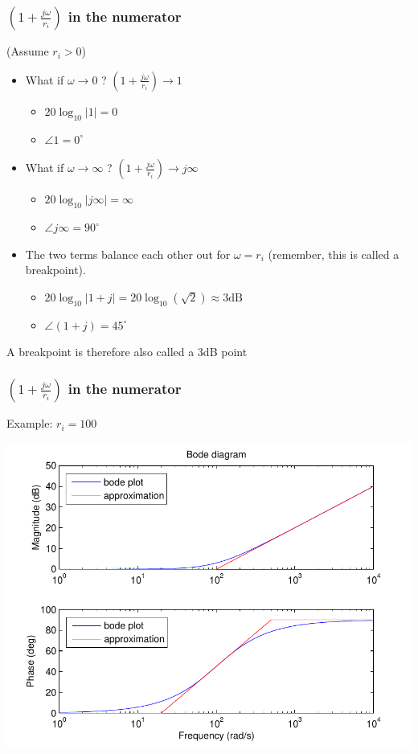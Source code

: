 \begin{frame}
\frametitle{$(1+\frac{j\omega}{r_i})$ in the numerator}
(Assume $r_i > 0$)
\begin{itemize}
\item What if $\omega \rightarrow 0$ ? \quad $(1+\frac{j\omega}{r_i}) \rightarrow 1$
\begin{itemize}
\item $20\log_{10}|1| = 0$
\item $\angle 1 = 0^{\circ}$
\end{itemize}

\item What if $\omega \rightarrow \infty$ ?  \quad  $(1+\frac{j\omega}{r_i}) \rightarrow j\infty$
\begin{itemize}
\item $20\log_{10}|j\infty| = \infty$
\item $\angle j\infty = 90^{\circ}$
\end{itemize}

\item The two terms balance each other out for $\omega = r_i$ (remember, this is called a breakpoint).
\begin{itemize}
\item $20\log_{10}|1+j| = 20\log_{10}(\sqrt 2) \approx 3 \text{dB}$
\item $\angle(1+j) = 45^{\circ}$
\end{itemize}
\end{itemize}
A breakpoint is therefore also called a 3dB point
\end{frame}



\begin{frame}
\frametitle{$(1+\frac{j\omega}{r_i})$ in the numerator}
Example: $r_i = 100$

\begin{center}
\includegraphics[scale=0.5]{BodeNumerator}
\end{center}

\end{frame}



